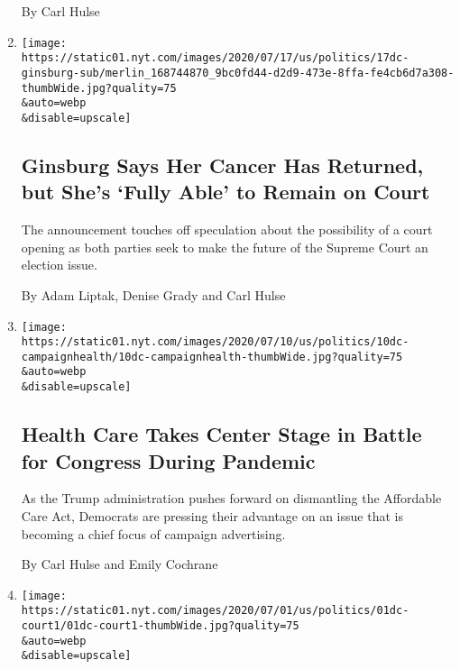 \begin{enumerate}
  By Carl Hulse
\item
  \href{/2020/07/17/us/justice-ruth-bader-ginsburg-cancer.html}{}

  \texttt{[image: https://static01.nyt.com/images/2020/07/17/us/politics/17dc-ginsburg-sub/merlin\_168744870\_9bc0fd44-d2d9-473e-8ffa-fe4cb6d7a308-thumbWide.jpg?quality=75\\\&auto=webp\\\&disable=upscale]}

  \hypertarget{ginsburg-says-her-cancer-has-returned-but-shes-fully-able-to-remain-on-court}{%
  \subsection{Ginsburg Says Her Cancer Has Returned, but She's `Fully
  Able' to Remain on
  Court}\label{ginsburg-says-her-cancer-has-returned-but-shes-fully-able-to-remain-on-court}}

  The announcement touches off speculation about the possibility of a
  court opening as both parties seek to make the future of the Supreme
  Court an election issue.

  By Adam Liptak, Denise Grady and Carl Hulse
\item
  \href{/2020/07/12/us/politics/health-care-aca-congress-elections.html}{}

  \texttt{[image: https://static01.nyt.com/images/2020/07/10/us/politics/10dc-campaignhealth/10dc-campaignhealth-thumbWide.jpg?quality=75\\\&auto=webp\\\&disable=upscale]}

  \hypertarget{health-care-takes-center-stage-in-battle-for-congress-during-pandemic}{%
  \subsection{Health Care Takes Center Stage in Battle for Congress
  During
  Pandemic}\label{health-care-takes-center-stage-in-battle-for-congress-during-pandemic}}

  As the Trump administration pushes forward on dismantling the
  Affordable Care Act, Democrats are pressing their advantage on an
  issue that is becoming a chief focus of campaign advertising.

  By Carl Hulse and Emily Cochrane
\item
  \href{/2020/07/01/us/progressives-begin-new-push-to-elevate-supreme-court-as-a-campaign-issue.html}{}

  \texttt{[image: https://static01.nyt.com/images/2020/07/01/us/politics/01dc-court1/01dc-court1-thumbWide.jpg?quality=75\\\&auto=webp\\\&disable=upscale]}


\end{enumerate}
